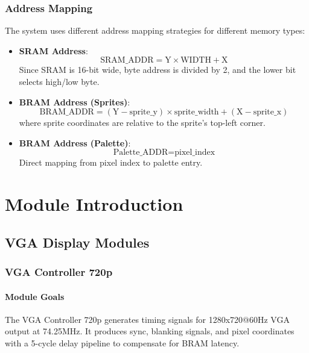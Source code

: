 \documentclass[12pt,a4paper]{article}
\begin{document}
\subsubsection{Address Mapping}
The system uses different address mapping strategies for different memory types:
\begin{itemize}
    \item \textbf{SRAM Address}: 
    \begin{equation}
    \text{SRAM\_ADDR} = \text{Y} \times \text{WIDTH} + \text{X}
    \end{equation}
    Since SRAM is 16-bit wide, byte address is divided by 2, and the lower bit selects high/low byte.
    \item \textbf{BRAM Address (Sprites)}:
    \begin{equation}
    \text{BRAM\_ADDR} = (\text{Y} - \text{sprite\_y}) \times \text{sprite\_width} + (\text{X} - \text{sprite\_x})
    \end{equation}
    where sprite coordinates are relative to the sprite's top-left corner.
    \item \textbf{BRAM Address (Palette)}:
    \begin{equation}
    \text{Palette\_ADDR} = \text{pixel\_index}
    \end{equation}
    Direct mapping from pixel index to palette entry.
\end{itemize}

\section{Module Introduction}

\subsection{VGA Display Modules}
\subsubsection{VGA Controller 720p}

\paragraph{Module Goals}
The VGA Controller 720p generates timing signals for 1280x720@60Hz VGA output at 74.25MHz. It produces sync, blanking signals, and pixel coordinates with a 5-cycle delay pipeline to compensate for BRAM latency.
\end{document}
